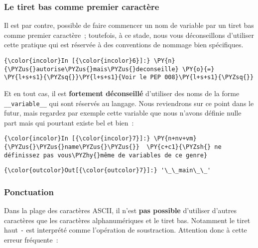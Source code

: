     \hypertarget{le-tiret-bas-comme-premier-caractuxe8re}{%
\subsubsection{Le tiret bas comme premier
caractère}\label{le-tiret-bas-comme-premier-caractuxe8re}}

    Il est par contre, possible de faire commencer un nom de variable par un
tiret bas comme premier caractère~; toutefois, à ce stade, nous vous
déconseillons d'utiliser cette pratique qui est réservée à des
conventions de nommage bien spécifiques.

    \begin{Verbatim}[commandchars=\\\{\}]
{\color{incolor}In [{\color{incolor}6}]:} \PY{n}{\PYZus{}autorise\PYZus{}mais\PYZus{}deconseille} \PY{o}{=} \PY{l+s+s1}{\PYZsq{}}\PY{l+s+s1}{Voir le PEP 008}\PY{l+s+s1}{\PYZsq{}}
\end{Verbatim}


    Et en tout cas, il est \textbf{fortement déconseillé} d'utiliser des
noms de la forme \texttt{\_\_variable\_\_} qui sont réservés au langage.
Nous reviendrons sur ce point dans le futur, mais regardez par exemple
cette variable que nous n'avons définie nulle part mais qui pourtant
existe bel et bien~:

    \begin{Verbatim}[commandchars=\\\{\}]
{\color{incolor}In [{\color{incolor}7}]:} \PY{n+nv+vm}{\PYZus{}\PYZus{}name\PYZus{}\PYZus{}}  \PY{c+c1}{\PYZsh{} ne définissez pas vous\PYZhy{}même de variables de ce genre}
\end{Verbatim}


\begin{Verbatim}[commandchars=\\\{\}]
{\color{outcolor}Out[{\color{outcolor}7}]:} '\_\_main\_\_'
\end{Verbatim}
            
    \hypertarget{ponctuation}{%
\subsubsection{Ponctuation}\label{ponctuation}}

    Dans la plage des caractères ASCII, il n'est \textbf{pas possible}
d'utiliser d'autres caractères que les caractères alphanumériques et le
tiret bas. Notamment le tiret haut \texttt{-} est interprété comme
l'opération de soustraction. Attention donc à cette erreur fréquente~:

